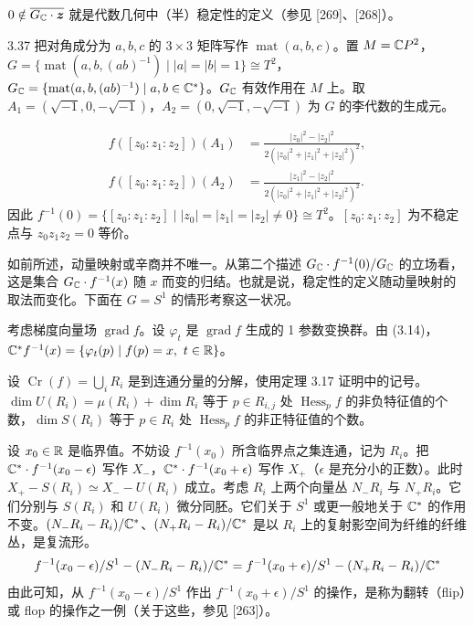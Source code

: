 $0\notin\overline{G_{\mathbb{C}}\cdot\bm z}$ 就是代数几何中（半）稳定性的定义（参见 [269]、[268]）。

\begin{example}{3.37}
  把对角成分为 $a,b,c$ 的 $3\times3$ 矩阵写作 $\operatorname{mat}(a,b,c)$。置 $M=\mathbb{C}P^2$，$G=\{\operatorname{mat}(a,b,(ab)^{-1})\mid|a|=|b|=1\}\cong T^2$，$G_{\mathbb{C}}=\{\operatorname{mat}(a,b,(ab)^{-1})\mid a,b\in\mathbb{C}^*\}$。$G_{\mathbb{C}}$ 有效作用在 $M$ 上。取 $A_1=(\sqrt{-1},0,-\sqrt{-1})$，$A_2=(0,\sqrt{-1},-\sqrt{-1})$ 为 $G$ 的李代数的生成元。
\end{example}

\begin{equation}
  \begin{aligned}
    f([z_0:z_1:z_2])(A_1)&=\frac{|z_0|^2-|z_2|^2}{2(|z_0|^2+|z_1|^2+|z_2|^2)^2},\\
    f([z_0:z_1:z_2])(A_2)&=\frac{|z_1|^2-|z_2|^2}{2(|z_0|^2+|z_1|^2+|z_2|^2)^2}.
  \end{aligned}
  \tag{3.15}
\end{equation}
因此 $f^{-1}(0)=\{[z_0:z_1:z_2]\mid|z_0|=|z_1|=|z_2|\neq0\}\cong T^2$。$[z_0:z_1:z_2]$ 为不稳定点与 $z_0z_1z_2=0$ 等价。

如前所述，动量映射或辛商并不唯一。从第二个描述 $G_{\mathbb{C}}\cdot f^{-1}(0)/G_{\mathbb{C}}$ 的立场看，这是集合 $G_{\mathbb{C}}\cdot f^{-1}(x)$ 随 $x$ 而变的归结。也就是说，稳定性的定义随动量映射的取法而变化。下面在 $G=S^1$ 的情形考察这一状况。

考虑梯度向量场 $\operatorname{grad}f$。设 $\varphi_t$ 是 $\operatorname{grad}f$ 生成的 1 参数变换群。由 (3.14)，$\C^*f^{-1}(x)=\{\varphi_t(p)\mid f(p)=x,\ t\in\R\}$。

设 $\operatorname{Cr}(f)=\bigcup_iR_i$ 是到连通分量的分解，使用定理 3.17 证明中的记号。$\dim U(R_i)=\mu(R_i)+\dim R_i$ 等于 $p\in R_{i,j}$ 处 $\operatorname{Hess}_pf$ 的非负特征值的个数，$\dim S(R_i)$ 等于 $p\in R_i$ 处 $\operatorname{Hess}_pf$ 的非正特征值的个数。


设 $x_0\in\mathbb{R}$ 是临界值。不妨设 $f^{-1}(x_0)$ 所含临界点之集连通，记为 $R_i$。把 $\mathbb{C}^*\cdot f^{-1}(x_0-\epsilon)$ 写作 $X_-$，$\mathbb{C}^*\cdot f^{-1}(x_0+\epsilon)$ 写作 $X_+$（$\epsilon$ 是充分小的正数）。此时 $X_+-S(R_i)\simeq X_--U(R_i)$ 成立。考虑 $R_i$ 上两个向量丛 $N_-R_i$ 与 $N_+R_i$。它们分别与 $S(R_i)$ 和 $U(R_i)$ 微分同胚。它们关于 $S^1$ 或更一般地关于 $\mathbb{C}^*$ 的作用不变。$(N_-R_i-R_i)/\mathbb{C}^*$、$(N_+R_i-R_i)/\mathbb{C}^*$ 是以 $R_i$ 上的复射影空间为纤维的纤维丛，是复流形。
\[
  f^{-1}(x_0-\epsilon)/S^1-(N_-R_i-R_i)/\mathbb{C}^*=f^{-1}(x_0+\epsilon)/S^1-(N_+R_i-R_i)/\mathbb{C}^*
\]
由此可知，从 $f^{-1}(x_0-\epsilon)/S^1$ 作出 $f^{-1}(x_0+\epsilon)/S^1$ 的操作，是称为翻转（flip）或 flop 的操作之一例（关于这些，参见 [263]）。

